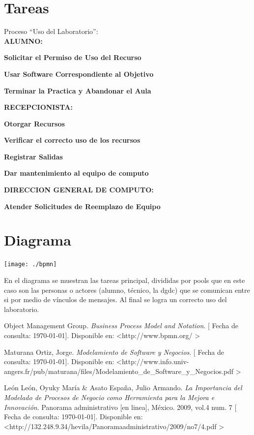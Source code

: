 \documentclass[spanish,12pt,letterpapper]{article}
\begin{document}
	\section{Tareas}
	Proceso ``Uso del Laboratorio'':\\
	
	\textbf{ALUMNO:}
	
	\textbf{Solicitar el Permiso de Uso del Recurso}
	
	\textbf{Usar Software Correspondiente al Objetivo}
	
	\textbf{Terminar la Practica y Abandonar el Aula\\}
	
	\textbf{RECEPCIONISTA:}
	
	\textbf{Otorgar Recursos}
	
	\textbf{Verificar el correcto uso de los recursos}
	
	\textbf{Registrar Salidas}	
	
	\textbf{Dar mantenimiento al equipo de computo\\}
	
	\textbf{DIRECCION GENERAL DE COMPUTO:}
	
	\textbf{Atender Solicitudes de Reemplazo de Equipo}
	
	\section{Diagrama}
	\begin{center}
	\texttt{[image: ./bpmn]}~\\[1cm]
	\end{center}
	
	En el diagrama se muestran las tareas principal, divididas por pools que en este caso son las personas o actores (alumno, técnico, la dgdc) que se comunican entre si por medio de vínculos de mensajes. Al final se logra un correcto uso del laboratorio.
	
	\pagebreak
	\begin{thebibliography}{9}
	 Object Management Group. 
		\emph{Business Process Model and Notation}. {[} Fecha de consulta: \today {]}. Disponible en: \textless http://www.bpmn.org/ \textgreater	
	
		 Maturana Ortiz, Jorge. 
		\emph{Modelamiento de Software y Negocios}. {[} Fecha de consulta: \today {]}. Disponible en: \textless http://www.info.univ-angers.fr/pub/maturana/files/Modelamiento\_de\_Software\_y\_Negocios.pdf \textgreater
		
		 León León, Oyuky María \& Asato España, Julio Armando. 
		\emph{La Importancia del Modelado de Procesos de
			Negocio como Herramienta para la Mejora e
			Innovación}. Panorama administrativo {[}en linea{]}, México. 2009, vol.4 num. 7  {[} Fecha de consulta: \today {]}. Disponible en: \textless http://132.248.9.34/hevila/Panoramaadministrativo/2009/no7/4.pdf \textgreater
	\end{thebibliography}
\end{document}
